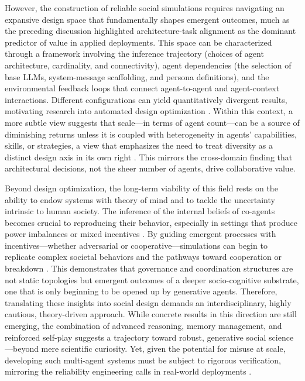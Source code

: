 \documentclass[11pt,a4paper]{article}
\begin{document}
However, the construction of reliable social simulations requires navigating an expansive design space that fundamentally shapes emergent outcomes, much as the preceding discussion highlighted architecture-task alignment as the dominant predictor of value in applied deployments. This space can be characterized through a framework involving the inference trajectory (choices of agent architecture, cardinality, and connectivity), agent dependencies (the selection of base LLMs, system-message scaffolding, and persona definitions), and the environmental feedback loops that connect agent-to-agent and agent-context interactions. Different configurations can yield quantitatively divergent results, motivating research into automated design optimization \cite{arxiv:2502.04180v2,arxiv:2502.02533v2}. Within this context, a more subtle view suggests that scale---in terms of agent count---can be a source of diminishing returns unless it is coupled with heterogeneity in agents' capabilities, skills, or strategies, a view that emphasizes the need to treat diversity as a distinct design axis in its own right \cite{arxiv:2602.03794v1}. This mirrors the cross-domain finding that architectural decisions, not the sheer number of agents, drive collaborative value.

Beyond design optimization, the long-term viability of this field rests on the ability to endow systems with theory of mind and to tackle the uncertainty intrinsic to human society. The inference of the internal beliefs of co-agents becomes crucial to reproducing their behavior, especially in settings that produce power imbalances or mixed incentives \cite{arxiv:2506.08292v1}. By guiding emergent processes with incentives---whether adversarial or cooperative---simulations can begin to replicate complex societal behaviors and the pathways toward cooperation or breakdown \cite{arxiv:2506.08292v1}. This demonstrates that governance and coordination structures are not static topologies but emergent outcomes of a deeper socio-cognitive substrate, one that is only beginning to be opened up by generative agents. Therefore, translating these insights into social design demands an interdisciplinary, highly cautious, theory-driven approach. While concrete results in this direction are still emerging, the combination of advanced reasoning, memory management, and reinforced self-play suggests a trajectory toward robust, generative social science---beyond mere scientific curiosity. Yet, given the potential for misuse at scale, developing such multi-agent systems must be subject to rigorous verification, mirroring the reliability engineering calls in real-world deployments \cite{arxiv:2605.24309v1}.
\end{document}
